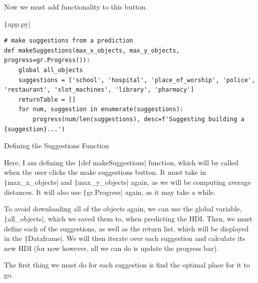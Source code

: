 \documentclass[12pt]{report}
\newcommand{\pil}[1]{\protect\texttt|#1|}
\begin{document}
Now we must add functionality to this button.

\begin{listing}[H]
\pil{app.py}
\begin{verbatim}
# make suggestions from a prediction
def makeSuggestions(max_x_objects, max_y_objects, progress=gr.Progress()):
    global all_objects
    suggestions = ['school', 'hospital', 'place_of_worship', 'police', 'restaurant', 'slot_machines', 'library', 'pharmacy']
    returnTable = []
    for num, suggestion in enumerate(suggestions):
        progress(num/len(suggestions), desc=f'Suggesting building a {suggestion}...')
\end{verbatim}
\caption{Defining the Suggestions Function}\label{cs:suggestionsFunction}
\end{listing}

Here, I am defining the \pil{def makeSuggestions} function, which will be called when the user clicks the make suggestions button. It must take in \pil{max_x_objects} and \pil{max_y_objects} again, as we will be computing average distances. It will also use \pil{gr.Progress} again, as it may take a while.

To avoid downloading all of the objects again, we can use the global variable, \pil{all_objects}, which we saved them to, when predicting the HDI. Then, we must define each of the suggestions, as well as the return list, which will be displayed in the \pil{Dataframe}. We will then iterate over each suggestion and calculate its new HDI (for now however, all we can do is update the progress bar).

\begin{center}
\end{center}

The first thing we must do for each suggestion is find the optimal place for it to go.
\end{document}
